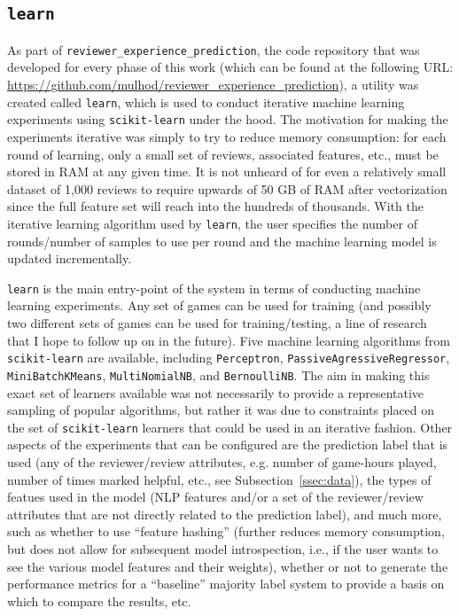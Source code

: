 \documentclass[9pt]{article}
\begin{document}
\subsection{{\tt learn}}
\label{ssec:learn}

As part of {\tt reviewer\_experience\_prediction}, the code repository that was developed for every phase of this work (which can be found at the following URL: \url{https://github.com/mulhod/reviewer_experience_prediction}), a utility was created called {\tt learn}, which is used to conduct iterative machine learning experiments using {\tt scikit-learn} under the hood. The motivation for making the experiments iterative was simply to try to reduce memory consumption: for each round of learning, only a small set of reviews, associated features, etc., must be stored in RAM at any given time. It is not unheard of for even a relatively small dataset of 1,000 reviews to require upwards of 50 GB of RAM after vectorization since the full feature set will reach into the hundreds of thousands. With the iterative learning algorithm used by {\tt learn}, the user specifies the number of rounds/number of samples to use per round and the machine learning model is updated incrementally.

{\tt learn} is the main entry-point of the system in terms of conducting machine learning experiments. Any set of games can be used for training (and possibly two different sets of games can be used for training/testing, a line of research that I hope to follow up on in the future). Five machine learning algorithms from {\tt scikit-learn} are available, including {\tt Perceptron}, { \tt PassiveAgressiveRegressor}, {\tt MiniBatchKMeans}, {\tt MultiNomialNB}, and {\tt BernoulliNB}. The aim in making this exact set of learners available was not necessarily to provide a representative sampling of popular algorithms, but rather it was due to constraints placed on the set of {\tt scikit-learn} learners that could be used in an iterative fashion. Other aspects of the experiments that can be configured are the prediction label that is used (any of the reviewer/review attributes, e.g. number of game-hours played, number of times marked helpful, etc., see Subsection~\ref{ssec:data}), the types of featues used in the model (NLP features and/or a set of the reviewer/review attributes that are not directly related to the prediction label), and much more, such as whether to use ``feature hashing'' (further reduces memory consumption, but does not allow for subsequent model introspection, i.e., if the user wants to see the various model features and their weights), whether or not to generate the performance metrics for a ``baseline'' majority label system to provide a basis on which to compare the results, etc.
\end{document}
